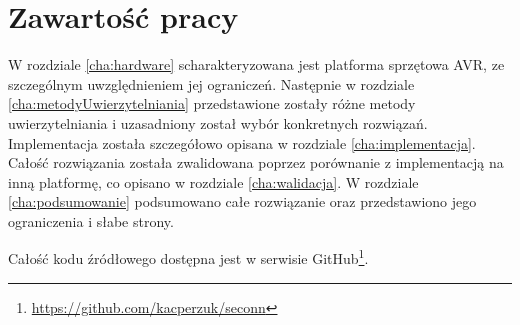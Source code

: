 \section{Zawartość pracy}

W rozdziale \ref{cha:hardware} scharakteryzowana jest platforma sprzętowa AVR, ze szczególnym uwzględnieniem jej ograniczeń. Następnie w rozdziale \ref{cha:metodyUwierzytelniania} przedstawione zostały różne metody uwierzytelniania i uzasadniony został wybór konkretnych rozwiązań. Implementacja została szczegółowo opisana w rozdziale \ref{cha:implementacja}. Całość rozwiązania została zwalidowana poprzez porównanie z implementacją na inną platformę, co opisano w rozdziale \ref{cha:walidacja}. W rozdziale \ref{cha:podsumowanie} podsumowano całe rozwiązanie oraz przedstawiono jego ograniczenia i słabe strony.

Całość kodu źródłowego dostępna jest w serwisie GitHub\footnote{\url{https://github.com/kacperzuk/seconn}}.
